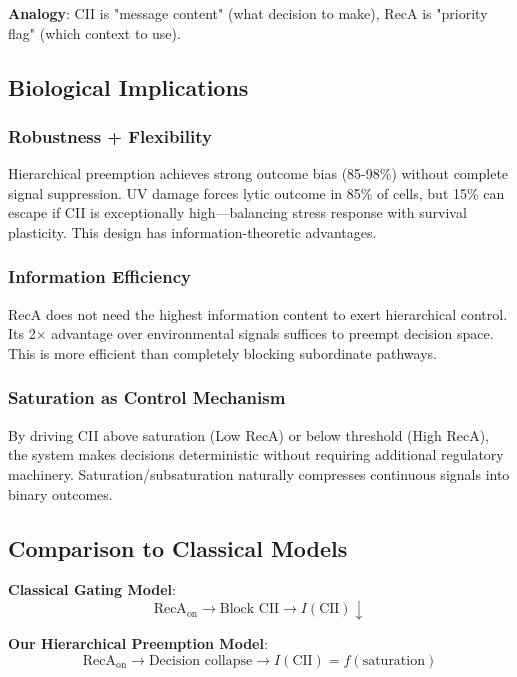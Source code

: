 \documentclass[10pt,twocolumn]{article}
\begin{document}
\textbf{Analogy}: CII is "message content" (what decision to make), RecA is "priority flag" (which context to use).

\subsection{Biological Implications}

\subsubsection{Robustness + Flexibility}

Hierarchical preemption achieves strong outcome bias (85-98\%) without complete signal suppression. UV damage forces lytic outcome in 85\% of cells, but 15\% can escape if CII is exceptionally high—balancing stress response with survival plasticity. This design has information-theoretic advantages.

\subsubsection{Information Efficiency}

RecA does not need the highest information content to exert hierarchical control. Its 2× advantage over environmental signals suffices to preempt decision space. This is more efficient than completely blocking subordinate pathways.

\subsubsection{Saturation as Control Mechanism}

By driving CII above saturation (Low RecA) or below threshold (High RecA), the system makes decisions deterministic without requiring additional regulatory machinery. Saturation/subsaturation naturally compresses continuous signals into binary outcomes.

\subsection{Comparison to Classical Models}

\textbf{Classical Gating Model}:
\begin{equation}
\text{RecA}_{\text{on}} \rightarrow \text{Block CII} \rightarrow I(\text{CII}) \downarrow
\end{equation}

\textbf{Our Hierarchical Preemption Model}:
\begin{equation}
\text{RecA}_{\text{on}} \rightarrow \text{Decision collapse} \rightarrow I(\text{CII}) = f(\text{saturation})
\end{equation}
\end{document}
